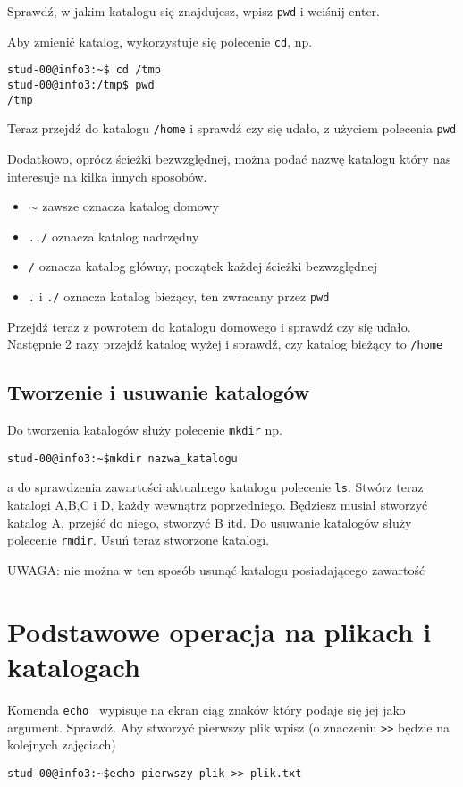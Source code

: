 \documentclass{instrukcja}
\begin{document}
Sprawdź, w jakim katalogu się znajdujesz, wpisz {\tt pwd} i wciśnij enter.

Aby zmienić katalog, wykorzystuje się polecenie {\tt cd}, np.
\begin{verbatim}
stud-00@info3:~$ cd /tmp
stud-00@info3:/tmp$ pwd
/tmp
\end{verbatim}

Teraz przejdź do katalogu {\tt /home} i sprawdź czy się udało, z użyciem polecenia {\tt pwd}

Dodatkowo, oprócz ścieżki bezwzględnej, można podać nazwę katalogu który nas interesuje na kilka innych sposobów.

\begin{itemize}
\item $\sim$  zawsze oznacza katalog domowy
\item {\tt ../} oznacza katalog nadrzędny
\item {\tt /} oznacza katalog główny, początek każdej ścieżki bezwzględnej
\item {\tt .} i {\tt ./} oznacza katalog bieżący, ten zwracany przez {\tt pwd}
\end{itemize}

Przejdź teraz z powrotem do katalogu domowego i sprawdź czy się udało. Następnie 2 razy przejdź katalog wyżej i sprawdź, czy katalog bieżący to {\tt /home}

\subsection{Tworzenie i usuwanie katalogów}

Do tworzenia katalogów służy polecenie {\tt mkdir} np.
\begin{verbatim}
stud-00@info3:~$mkdir nazwa_katalogu
\end{verbatim}

a do sprawdzenia zawartości aktualnego katalogu polecenie {\tt ls}. Stwórz teraz katalogi A,B,C i D, każdy wewnątrz poprzedniego. Będziesz musiał stworzyć katalog A, przejść do niego, stworzyć B itd.
Do usuwanie katalogów służy polecenie {\tt rmdir}. Usuń teraz stworzone katalogi.

UWAGA: nie można w ten sposób usunąć katalogu posiadającego zawartość

\section{Podstawowe operacja na plikach i katalogach}
Komenda {\tt echo } wypisuje na ekran ciąg znaków który podaje się jej jako argument. Sprawdź.
Aby stworzyć pierwszy plik wpisz (o znaczeniu {\tt >>} będzie na kolejnych zajęciach)
\begin{verbatim}
stud-00@info3:~$echo pierwszy plik >> plik.txt
\end{verbatim}
\end{document}
